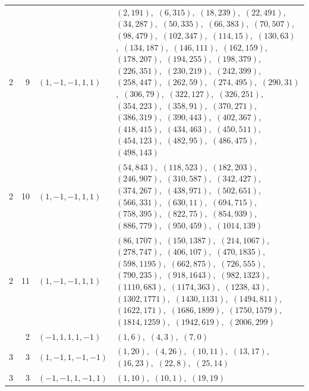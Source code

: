 \documentclass[11pt]{article}
\begin{document}
\begin{longtable}{@{}rrl>{\raggedright\arraybackslash}p{}@{}}
2 & 9 & $(1,-1,-1,1,1)$ & $(2,191)$,\allowbreak\ $(6,315)$,\allowbreak\ $(18,239)$,\allowbreak\ $(22,491)$,\allowbreak\ $(34,287)$,\allowbreak\ $(50,335)$,\allowbreak\ $(66,383)$,\allowbreak\ $(70,507)$,\allowbreak\ $(98,479)$,\allowbreak\ $(102,347)$,\allowbreak\ $(114,15)$,\allowbreak\ $(130,63)$,\allowbreak\ $(134,187)$,\allowbreak\ $(146,111)$,\allowbreak\ $(162,159)$,\allowbreak\ $(178,207)$,\allowbreak\ $(194,255)$,\allowbreak\ $(198,379)$,\allowbreak\ $(226,351)$,\allowbreak\ $(230,219)$,\allowbreak\ $(242,399)$,\allowbreak\ $(258,447)$,\allowbreak\ $(262,59)$,\allowbreak\ $(274,495)$,\allowbreak\ $(290,31)$,\allowbreak\ $(306,79)$,\allowbreak\ $(322,127)$,\allowbreak\ $(326,251)$,\allowbreak\ $(354,223)$,\allowbreak\ $(358,91)$,\allowbreak\ $(370,271)$,\allowbreak\ $(386,319)$,\allowbreak\ $(390,443)$,\allowbreak\ $(402,367)$,\allowbreak\ $(418,415)$,\allowbreak\ $(434,463)$,\allowbreak\ $(450,511)$,\allowbreak\ $(454,123)$,\allowbreak\ $(482,95)$,\allowbreak\ $(486,475)$,\allowbreak\ $(498,143)$\\
2 & 10 & $(1,-1,-1,1,1)$ & $(54,843)$,\allowbreak\ $(118,523)$,\allowbreak\ $(182,203)$,\allowbreak\ $(246,907)$,\allowbreak\ $(310,587)$,\allowbreak\ $(342,427)$,\allowbreak\ $(374,267)$,\allowbreak\ $(438,971)$,\allowbreak\ $(502,651)$,\allowbreak\ $(566,331)$,\allowbreak\ $(630,11)$,\allowbreak\ $(694,715)$,\allowbreak\ $(758,395)$,\allowbreak\ $(822,75)$,\allowbreak\ $(854,939)$,\allowbreak\ $(886,779)$,\allowbreak\ $(950,459)$,\allowbreak\ $(1014,139)$\\
2 & 11 & $(1,-1,-1,1,1)$ & $(86,1707)$,\allowbreak\ $(150,1387)$,\allowbreak\ $(214,1067)$,\allowbreak\ $(278,747)$,\allowbreak\ $(406,107)$,\allowbreak\ $(470,1835)$,\allowbreak\ $(598,1195)$,\allowbreak\ $(662,875)$,\allowbreak\ $(726,555)$,\allowbreak\ $(790,235)$,\allowbreak\ $(918,1643)$,\allowbreak\ $(982,1323)$,\allowbreak\ $(1110,683)$,\allowbreak\ $(1174,363)$,\allowbreak\ $(1238,43)$,\allowbreak\ $(1302,1771)$,\allowbreak\ $(1430,1131)$,\allowbreak\ $(1494,811)$,\allowbreak\ $(1622,171)$,\allowbreak\ $(1686,1899)$,\allowbreak\ $(1750,1579)$,\allowbreak\ $(1814,1259)$,\allowbreak\ $(1942,619)$,\allowbreak\ $(2006,299)$\\
\addlinespace[3pt]
3 & 2 & $(-1,1,1,1,-1)$ & $(1,6)$,\allowbreak\ $(4,3)$,\allowbreak\ $(7,0)$\\
3 & 3 & $(1,-1,1,-1,-1)$ & $(1,20)$,\allowbreak\ $(4,26)$,\allowbreak\ $(10,11)$,\allowbreak\ $(13,17)$,\allowbreak\ $(16,23)$,\allowbreak\ $(22,8)$,\allowbreak\ $(25,14)$\\
3 & 3 & $(-1,-1,1,-1,1)$ & $(1,10)$,\allowbreak\ $(10,1)$,\allowbreak\ $(19,19)$\\

\end{longtable}
\end{document}
